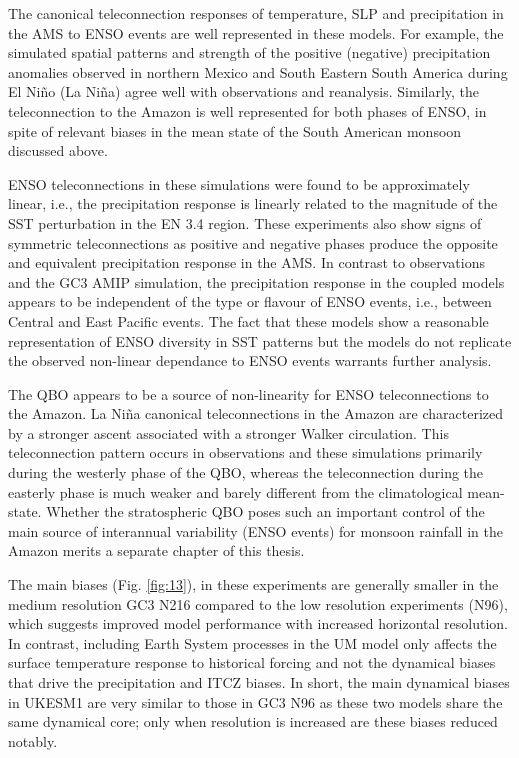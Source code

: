   
The canonical teleconnection responses  of  temperature, SLP and precipitation in the AMS to ENSO events are well represented in these models. For example, the simulated spatial patterns and strength of the positive (negative) precipitation anomalies observed in northern Mexico and South Eastern South America during El Ni\~no (La Ni\~na) agree well with observations and reanalysis.
 Similarly, the teleconnection to the Amazon is well represented for both phases of ENSO, in spite of relevant biases in the mean state of the South American monsoon discussed above. %
 
ENSO teleconnections in these simulations were found to be approximately linear, i.e., the precipitation response is linearly related to the magnitude of the SST perturbation in the EN 3.4 region. These experiments also show signs of symmetric teleconnections as positive and negative phases produce the opposite and equivalent precipitation response in the AMS. In contrast to observations and the GC3 AMIP simulation, the precipitation response in the coupled models appears to be independent of the type or flavour of ENSO events, i.e., between Central and East Pacific events. The fact that these models show a reasonable representation of ENSO diversity in SST patterns but the models  do not replicate the observed non-linear dependance to ENSO events warrants further analysis.

The QBO appears to be a source of non-linearity for ENSO teleconnections to the Amazon. La Niña canonical teleconnections in the Amazon are characterized by a stronger ascent associated with a stronger Walker circulation. This teleconnection pattern occurs in observations and these simulations primarily during the westerly phase of the QBO, whereas the teleconnection during the easterly phase is much weaker and barely different from the climatological mean-state. Whether the stratospheric QBO poses such an important control of the main source of interannual variability (ENSO events) for monsoon rainfall in the Amazon merits a separate chapter of this thesis. 

The main biases (Fig. \ref{fig:13}), in these experiments are generally smaller in the medium resolution GC3 N216 compared to the low resolution experiments (N96), which suggests improved model performance with increased horizontal resolution.
In contrast, including Earth System processes in the UM model only affects the surface temperature response to historical forcing and not the dynamical biases that drive the precipitation and ITCZ biases. 
In short, the main dynamical biases in UKESM1 are very similar to those in GC3 N96 as these two models  share the same dynamical core; only when resolution is increased are these biases reduced notably. 

